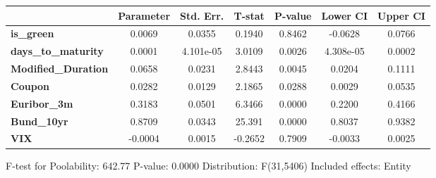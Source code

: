 \begin{center}
\begin{tabular}{lclc}
\bottomrule
\end{tabular}
\begin{tabular}{lcccccc}
                            & \textbf{Parameter} & \textbf{Std. Err.} & \textbf{T-stat} & \textbf{P-value} & \textbf{Lower CI} & \textbf{Upper CI}  \\
\midrule
\textbf{is\_green}          &       0.0069       &       0.0355       &      0.1940     &      0.8462      &      -0.0628      &       0.0766       \\
\textbf{days\_to\_maturity} &       0.0001       &     4.101e-05      &      3.0109     &      0.0026      &     4.308e-05     &       0.0002       \\
\textbf{Modified\_Duration} &       0.0658       &       0.0231       &      2.8443     &      0.0045      &       0.0204      &       0.1111       \\
\textbf{Coupon}             &       0.0282       &       0.0129       &      2.1865     &      0.0288      &       0.0029      &       0.0535       \\
\textbf{Euribor\_3m}        &       0.3183       &       0.0501       &      6.3466     &      0.0000      &       0.2200      &       0.4166       \\
\textbf{Bund\_10yr}         &       0.8709       &       0.0343       &      25.391     &      0.0000      &       0.8037      &       0.9382       \\
\textbf{VIX}                &      -0.0004       &       0.0015       &     -0.2652     &      0.7909      &      -0.0033      &       0.0025       \\
\bottomrule
\end{tabular}
\end{center}

F-test for Poolability: 642.77 \newline
 P-value: 0.0000 \newline
 Distribution: F(31,5406) \newline
  \newline
 Included effects: Entity